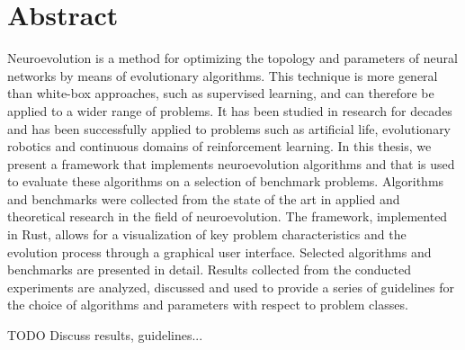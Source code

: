 \section*{Abstract}

Neuroevolution is a method for optimizing the topology and parameters of neural networks by means of evolutionary algorithms.
This technique is more general than white-box approaches, such as supervised learning, and can therefore be applied to a wider range of
problems. It has been studied in research for decades and has been successfully applied to problems such as artificial life,
evolutionary robotics and continuous domains of reinforcement learning.
In this thesis, we present a framework that implements neuroevolution algorithms and that is used to evaluate these algorithms on a
selection of benchmark problems. Algorithms and benchmarks were collected from the state of the art in applied and theoretical research in
the field of neuroevolution. The framework, implemented in Rust, allows for a visualization of key problem characteristics and the evolution
process through a graphical user interface. Selected algorithms and benchmarks are presented in detail. Results collected from the conducted
experiments are analyzed, discussed and used to provide a series of guidelines for the choice of algorithms and parameters with respect
to problem classes.

TODO Discuss results, guidelines...
